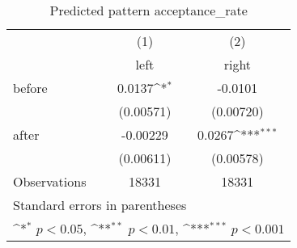 \begin{table}[htbp]\centering
\def\sym#1{\ifmmode^{#1}\else\(^{#1}\)\fi}
\caption{Predicted pattern acceptance\_rate}
\begin{tabular}{l*{2}{c}}
\hline\hline
                    &\multicolumn{1}{c}{(1)}&\multicolumn{1}{c}{(2)}\\
                    &\multicolumn{1}{c}{left}&\multicolumn{1}{c}{right}\\
\hline
before              &      0.0137\sym{*}  &     -0.0101         \\
                    &   (0.00571)         &   (0.00720)         \\
[1em]
after               &    -0.00229         &      0.0267\sym{***}\\
                    &   (0.00611)         &   (0.00578)         \\
\hline
Observations        &       18331         &       18331         \\
\hline\hline
\multicolumn{3}{l}{\footnotesize Standard errors in parentheses}\\
\multicolumn{3}{l}{\footnotesize \sym{*} \(p<0.05\), \sym{**} \(p<0.01\), \sym{***} \(p<0.001\)}\\
\end{tabular}
\end{table}
